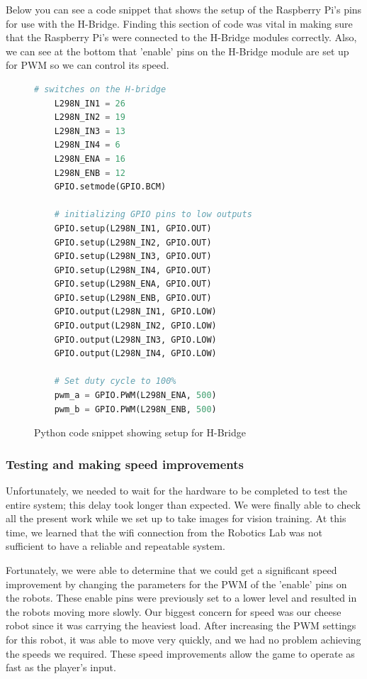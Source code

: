 \documentclass[a4paper,12pt]{article}
\begin{document}
	Below you can see a code snippet that shows the setup of the Raspberry Pi’s pins for use with the H-Bridge. Finding this section of code was vital in making sure that the Raspberry Pi’s were connected to the H-Bridge modules correctly. Also, we can see at the bottom that 'enable' pins on the H-Bridge module are set up for PWM so we can control its speed.

	\begin{figure}
	\begin{lstlisting}[language=Python]
	# switches on the H-bridge
    L298N_IN1 = 26
    L298N_IN2 = 19
    L298N_IN3 = 13
    L298N_IN4 = 6
    L298N_ENA = 16
    L298N_ENB = 12
    GPIO.setmode(GPIO.BCM)

    # initializing GPIO pins to low outputs
    GPIO.setup(L298N_IN1, GPIO.OUT)
    GPIO.setup(L298N_IN2, GPIO.OUT)
    GPIO.setup(L298N_IN3, GPIO.OUT)
    GPIO.setup(L298N_IN4, GPIO.OUT)
    GPIO.setup(L298N_ENA, GPIO.OUT)
    GPIO.setup(L298N_ENB, GPIO.OUT)
    GPIO.output(L298N_IN1, GPIO.LOW)
    GPIO.output(L298N_IN2, GPIO.LOW)
    GPIO.output(L298N_IN3, GPIO.LOW)
    GPIO.output(L298N_IN4, GPIO.LOW)
    
    # Set duty cycle to 100%
    pwm_a = GPIO.PWM(L298N_ENA, 500)
    pwm_b = GPIO.PWM(L298N_ENB, 500)

	\end{lstlisting}
	\caption{Python code snippet showing setup for H-Bridge}
	\end{figure}
	
	\subsubsection{Testing and making speed improvements}

	Unfortunately, we needed to wait for the hardware to be completed to test the entire system; this delay took longer than expected. We were finally able to check all the present work while we set up to take images for vision training. At this time, we learned that the wifi connection from the Robotics Lab was not sufficient to have a reliable and repeatable system. 
	
	Fortunately, we were able to determine that we could get a significant speed improvement by changing the parameters for the PWM of the 'enable' pins on the robots. These enable pins were previously set to a lower level and resulted in the robots moving more slowly. Our biggest concern for speed was our cheese robot since it was carrying the heaviest load. After increasing the PWM settings for this robot, it was able to move very quickly, and we had no problem achieving the speeds we required. These speed improvements allow the game to operate as fast as the player's input.
	
\end{document}
